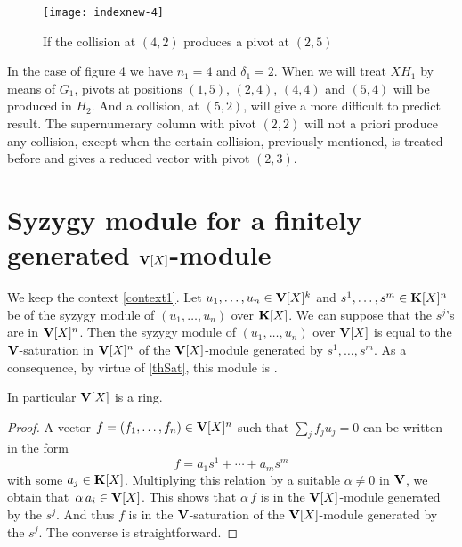 \begin{figure}[ht]
%
\begin{center}
\texttt{[image: indexnew-4]}

\caption[figure 4]
{\label{fig4} If the collision at $(4,2)$ produces a pivot at $(2,5)$}

\end{center}
\end{figure}


In the case of figure 4 we have  $n_1=4$ and $\delta_1=2$.
When we will treat  $XH_1$ by means of $G_1$,
 pivots at positions $(1,5)$, $(2,4)$, $(4,4)$ and $(5,4)$
will be  produced in $H_2$. And a collision, at $(5,2)$, will give a more difficult to predict result.
The supernumerary column with pivot $(2,2)$ will not  a priori produce any collision,
except when the certain  collision, previously mentioned, is treated before and gives a reduced vector with pivot $(2,3)$.




\section{Syzygy module for a finitely generated  $\mathbf{V}[X]$-module} \label{VXsysygies}

\begin{theorem} \label{thsyzygies}
We keep the context \ref{context1}.
Let $u_1,\dots,u_n\in\mathbf{V}[X]^k$ and $s^1,\dots,s^m\in\mathbf{K}[X]^n$ be \gtrs of the syzygy
module of $(u_1,\dots,u_n)$ over $\mathbf{K}[X]$. We can suppose that
the $s^j$’s are in $\mathbf{V}[X]^n$. Then the syzygy  module of $(u_1,\dots,u_n)$ over $\mathbf{V}[X]$ is equal to the $\mathbf{V}$-saturation  in $\mathbf{V}[X]^n$ of the $\mathbf{V}[X]$-module generated by
$s^1,\dots,s^m$. As a consequence, by virtue of  \tho \ref{thSat}, this
 module is \tf.

\noindent In particular $\mathbf{V}[X]$ is a \coh ring.
\end{theorem}

%
\begin{proof}
A vector $f=(f_1,\dots,f_n)\in\mathbf{V}[X]^n$ such that $\sum_jf_ju_j=0$
can be written in the form
  $$
  f=a_1s^1+\cdots+a_ms^m
  $$
with some $a_j\in\mathbf{K}[X]$.
Multiplying this relation by a suitable $\alpha\neq 0$ in $\mathbf{V}$,
we obtain that~$\alpha\, a_i\in\mathbf{V}[X]$. This shows that $\alpha\,f$ is in the $\mathbf{V}[X]$-module generated by the $s^j$. And thus $f$ is in the 
$\mathbf{V}$-saturation of the $\mathbf{V}[X]$-module generated by the $s^j$.
The converse is straightforward.
\end{proof}
%

